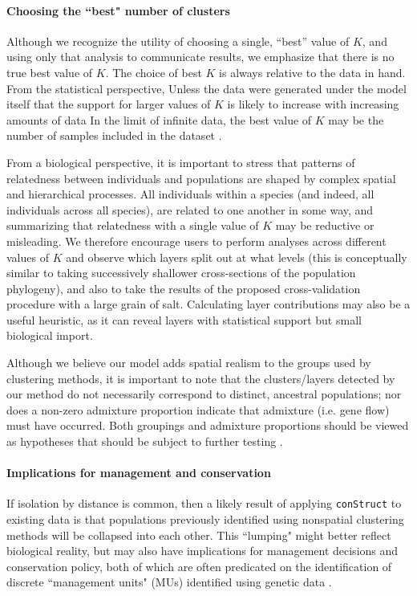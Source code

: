 \documentclass[12pt]{article}
\begin{document}
\paragraph{Choosing the ``best" number of clusters}
Although we recognize the utility of choosing a single, ``best'' value of $K$, 
and using only that analysis to communicate results, 
we emphasize that there is no true best value of $K$.
The choice of best $K$ is always relative to the data in hand.
From the statistical perspective, Unless the data were generated under the model itself 
that the support for larger values of $K$ is likely to increase with increasing amounts of data
In the limit of infinite data, the best value of $K$ 
may be the number of samples included in the dataset \citep{Patterson2006}.

From a biological perspective, 
it is important to stress that patterns of relatedness between individuals and populations 
are shaped by complex spatial and hierarchical processes.
All individuals within a species (and indeed, all individuals across all species), 
are related to one another in some way, 
and summarizing that relatedness with a single value of $K$ may be reductive or misleading.
We therefore encourage users to perform analyses across different values of $K$ and 
observe which layers split out at what levels 
(this is conceptually similar to taking successively shallower
cross-sections of the population phylogeny), 
and also to take the results of the proposed cross-validation procedure with a large grain of salt.
Calculating layer contributions may also be a useful heuristic, 
as it can reveal layers with statistical support but small biological import.

Although we believe our model adds spatial realism to the groups used by clustering methods,
it is important to note that the clusters/layers detected by our method 
do not necessarily correspond  to distinct, ancestral populations; 
nor does a non-zero admixture proportion indicate that admixture 
(i.e. gene flow) must have occurred. 
Both groupings and admixture proportions
should be viewed as hypotheses that should be subject to further testing
\citep[see][for an in-depth discussion of these points]{Falush:16}.

\paragraph{Implications for management and conservation}
If isolation by distance is common, 
then a likely result of applying \texttt{conStruct} to existing data is that 
populations previously identified using nonspatial clustering methods 
will be collapsed into each other.  
This ``lumping" might better reflect biological reality, 
but may also have implications for management decisions and conservation policy, 
both of which are often predicated on the identification of discrete ``management units" (MUs) 
identified using genetic data \citep{Moritz1994,Waples_1998,Moritz_etal_2002}.
\end{document}

